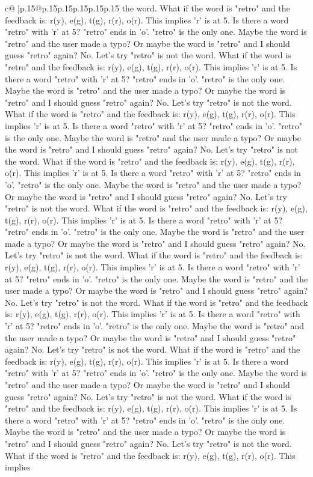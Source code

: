\documentclass{article}
\begin{document}
{\begin{supertabular}{c@{$\;$}|p{.15\linewidth}@{}p{.15\linewidth}p{.15\linewidth}p{.15\linewidth}p{.15\linewidth}p{.15\linewidth}}
{{{the word. What if the word is "retro" and the feedback is: r(y), e(g), t(g), r(r), o(r). This implies 'r' is at 5. Is there a word "retro" with 'r' at 5? "retro" ends in 'o'. "retro" is the only one. Maybe the word is "retro" and the user made a typo? Or maybe the word is "retro" and I should guess "retro" again? No. Let's try "retro" is not the word. What if the word is "retro" and the feedback is: r(y), e(g), t(g), r(r), o(r). This implies 'r' is at 5. Is there a word "retro" with 'r' at 5? "retro" ends in 'o'. "retro" is the only one. Maybe the word is "retro" and the user made a typo? Or maybe the word is "retro" and I should guess "retro" again? No. Let's try "retro" is not the word. What if the word is "retro" and the feedback is: r(y), e(g), t(g), r(r), o(r). This implies 'r' is at 5. Is there a word "retro" with 'r' at 5? "retro" ends in 'o'. "retro" is the only one. Maybe the word is "retro" and the user made a typo? Or maybe the word is "retro" and I should guess "retro" again? No. Let's try "retro" is not the word. What if the word is "retro" and the feedback is: r(y), e(g), t(g), r(r), o(r). This implies 'r' is at 5. Is there a word "retro" with 'r' at 5? "retro" ends in 'o'. "retro" is the only one. Maybe the word is "retro" and the user made a typo? Or maybe the word is "retro" and I should guess "retro" again? No. Let's try "retro" is not the word. What if the word is "retro" and the feedback is: r(y), e(g), t(g), r(r), o(r). This implies 'r' is at 5. Is there a word "retro" with 'r' at 5? "retro" ends in 'o'. "retro" is the only one. Maybe the word is "retro" and the user made a typo? Or maybe the word is "retro" and I should guess "retro" again? No. Let's try "retro" is not the word. What if the word is "retro" and the feedback is: r(y), e(g), t(g), r(r), o(r). This implies 'r' is at 5. Is there a word "retro" with 'r' at 5? "retro" ends in 'o'. "retro" is the only one. Maybe the word is "retro" and the user made a typo? Or maybe the word is "retro" and I should guess "retro" again? No. Let's try "retro" is not the word. What if the word is "retro" and the feedback is: r(y), e(g), t(g), r(r), o(r). This implies 'r' is at 5. Is there a word "retro" with 'r' at 5? "retro" ends in 'o'. "retro" is the only one. Maybe the word is "retro" and the user made a typo? Or maybe the word is "retro" and I should guess "retro" again? No. Let's try "retro" is not the word. What if the word is "retro" and the feedback is: r(y), e(g), t(g), r(r), o(r). This implies 'r' is at 5. Is there a word "retro" with 'r' at 5? "retro" ends in 'o'. "retro" is the only one. Maybe the word is "retro" and the user made a typo? Or maybe the word is "retro" and I should guess "retro" again? No. Let's try "retro" is not the word. What if the word is "retro" and the feedback is: r(y), e(g), t(g), r(r), o(r). This implies 'r' is at 5. Is there a word "retro" with 'r' at 5? "retro" ends in 'o'. "retro" is the only one. Maybe the word is "retro" and the user made a typo? Or maybe the word is "retro" and I should guess "retro" again? No. Let's try "retro" is not the word. What if the word is "retro" and the feedback is: r(y), e(g), t(g), r(r), o(r). This implies }}}
\end{supertabular}}
\end{document}
